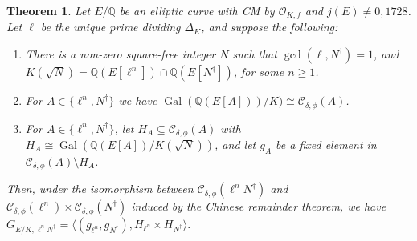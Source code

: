 \documentclass[11pt]{amsart}
\newtheorem{lemma}[defn]{Lemma}
\newtheorem{theorem}[defn]{Theorem}
\theoremstyle{definition}
\newcommand{\Q}{\mathbb{Q}}
\newcommand{\Z}{\mathbb{Z}}
\newcommand{\Of}{\mathcal{O}_{K,f}}
\newcommand{\cC}{\mathcal{C}}
\newcommand{\Gal}{\operatorname{Gal}}
\newcommand{\GL}{\operatorname{GL}}
\begin{document}


\begin{theorem}\label{thm-cartan-image} Let $E/\Q$ be an elliptic curve with CM by $\Of$ and $j(E) \neq 0, 1728$. Let $\ell$ be the unique prime dividing $\Delta_K$, and suppose the following:
\begin{enumerate}
    \item There is a non-zero square-free integer $N$ such that $\gcd(\ell,N^\dagger)=1$, and $K(\sqrt{N}) = \Q(E[\ell^n]) \cap \Q(E[N^\dagger])$, for some $n \geq 1$. 
    \item For $A\in \{ \ell^n, N^\dagger\}$ we have $\Gal(\Q(E[A]))/K)\cong \cC_{\delta,\phi}(A)$.
    \item For $A\in \{\ell^n,N^\dagger\}$, let $H_{A} \subseteq \mathcal{C}_{\delta, \phi}(A)$ with $H_{A} \cong \Gal(\Q(E[A])/K(\sqrt{N}))$, and let $g_{A}$ be a fixed element in $\mathcal{C}_{\delta, \phi}(A) \setminus H_{A}$. 
\end{enumerate}
Then, under the isomorphism between $\mathcal{C}_{\delta, \phi}(\ell^n N^\dagger)$ and $\mathcal{C}_{\delta, \phi}(\ell^n) \times \mathcal{C}_{\delta, \phi}(N^\dagger)$ induced by the Chinese remainder theorem, we have $G_{E/K, \ell^n N^\dagger} = \langle (g_{\ell^n}, g_{N^\dagger}), H_{\ell^n} \times H_{N^\dagger} \rangle.$

\end{theorem}
\end{document}
